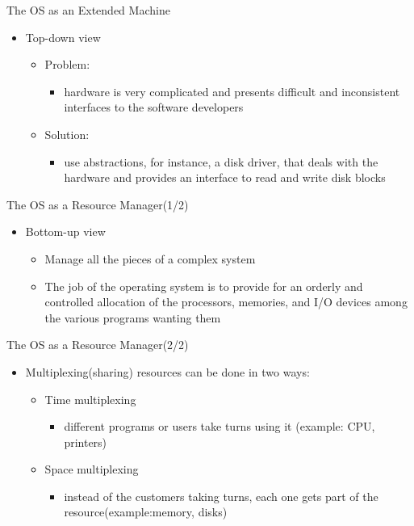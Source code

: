 \documentclass{beamer}
\begin{document}
\begin{frame}
{\centerline{The OS as an Extended Machine}}
\begin{itemize}
    \item Top-down view
    \begin{itemize}
        \item Problem:
        \begin{itemize}
            \item hardware is very complicated and presents difficult and inconsistent interfaces to the software developers
        \end{itemize}
        \item Solution:
        \begin{itemize}
            \item use abstractions, for instance, a disk driver, that deals with the hardware and provides an interface to read and write disk blocks
        \end{itemize}
    \end{itemize}
\end{itemize}
\end{frame}

\begin{frame}
{\centerline{The OS as a Resource Manager(1/2)}}
\begin{itemize}
    \item Bottom-up view
    \begin{itemize}
        \item Manage all the pieces of a complex system
        \item The job of the operating system is to provide for an orderly and controlled allocation of the processors, memories, and I/O devices among the various programs wanting them
    \end{itemize}
\end{itemize}
\end{frame}


\begin{frame}
{\centerline{The OS as a Resource Manager(2/2)}}
\begin{itemize}
    \item Multiplexing(sharing) resources can be done in two ways:
    \begin{itemize}
        \item Time multiplexing
        \begin{itemize}
            \item different programs or users take turns using it (example: CPU, printers)
        \end{itemize}
        \item Space multiplexing
        \begin{itemize}
            \item instead of the customers taking turns, each one gets part of the resource(example:memory, disks)
        \end{itemize}
    \end{itemize}
\end{itemize}
\end{frame}
\end{document}

